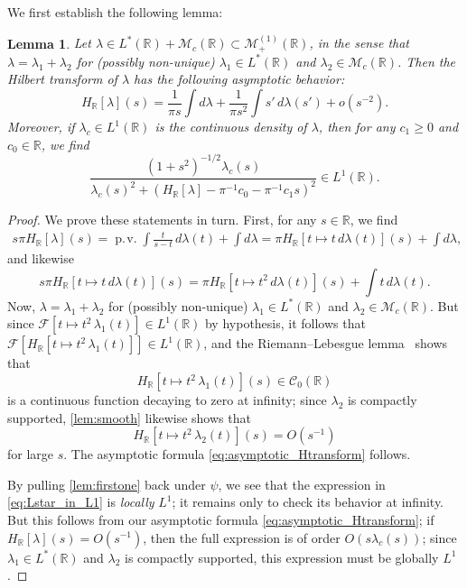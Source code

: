 \documentclass{cams-l} %
\newcommand{\dave}[1]{#1}\newcommand{\davebegin}{}\newcommand{\daveend}{}\newcommand{\george}[1]{#1}
\newcommand{\RR}{\mathbb R}
\newcommand{\cM}{\mathcal M}
\newcommand{\cC}{\mathcal C}
\newcommand{\cF}{\mathcal F}
\newcommand{\op}{\operatorname}
\newcommand{\pv}{\op{p.\!v.}}
\newtheorem{lemma}[theorem]{Lemma}
\theoremstyle{definition}
\theoremstyle{remark}
\numberwithin{equation}{section}
\begin{document}
We first establish the following lemma:
\begin{lemma}\label{lem:Lstar}
    Let $\lambda\in L^*(\RR) +\cM_c(\RR)\subset\cM_+^{(1)}(\RR)$, in the sense that $\lambda=\lambda_1+\lambda_2$ for (possibly non-unique) $\lambda_1\in L^*(\RR)$ and $\lambda_2\in\cM_c(\RR)$. Then the Hilbert transform of $\lambda$ has the following asymptotic behavior:
    \begin{equation}\label{eq:asymptotic_Htransform}
        H_\RR[\lambda](s) = \frac{1}{\pi s} \int d\lambda + \frac{1}{\pi s^2}\int s'\,d\lambda(s') + o(s^{-2}).
    \end{equation}
    Moreover, if $\lambda_c\in L^1(\RR)$ is the continuous density of $\lambda$, then for any $c_1\geq 0$ and $c_0\in\RR$, we find
    \begin{equation}\label{eq:Lstar_in_L1}
        \frac{(1+s^2)^{-1/2}\lambda_c(s)}{\lambda_c(s)^2 + (H_\RR[\lambda] - \pi^{-1}c_0 - \pi^{-1}c_1s)^2}\in L^1(\RR).
    \end{equation}
\end{lemma}
\begin{proof}
    \dave{We prove these statements in turn. First, for any $s\in\RR$, we find
    \begin{align*}
        s\pi H_\RR[\lambda](s) = \pv\int\frac{t}{s-t}\,d\lambda(t) +  \int d\lambda= \pi H_\RR[t\mapsto t\,d\lambda(t)](s) +  \int d\lambda,
    \end{align*}
    and likewise}
    \[s\pi H_\RR[t\mapsto t\,d\lambda(t)](s) = \pi H_\RR[t\mapsto t^2\,d\lambda(t)](s) + \int t\,d\lambda(t).\]
    Now, $\lambda = \lambda_1 + \lambda_2$ for (possibly non-unique) $\lambda_1\in L^*(\RR)$ and $\lambda_2\in\cM_c(\RR)$. But since $\cF[t\mapsto t^2\,\lambda_1(t)] \in L^1(\RR)$ by hypothesis, it follows that $\cF[H_\RR[t\mapsto t^2\,\lambda_1(t)]]\in L^1(\RR)$, and the Riemann--Lebesgue lemma~\cite{royden2010real} shows that 
    \[H_\RR[t\mapsto t^2\,\lambda_1(t)](s)\in\cC_0(\RR)\]
    is a continuous function decaying to zero at infinity; since $\lambda_2$ is compactly supported, \cref{lem:smooth} likewise shows that 
    \[H_\RR[t\mapsto t^2\,\lambda_2(t)](s) = O(s^{-1})\]
    for large $s$. The asymptotic formula \cref{eq:asymptotic_Htransform} follows.

    By pulling \cref{lem:firstone} back under $\psi$, we see that the expression in \cref{eq:Lstar_in_L1} is \emph{locally} $L^1$; it remains only to check its behavior at infinity. But this follows from our asymptotic formula \cref{eq:asymptotic_Htransform}; if $H_\RR[\lambda](s)=O(s^{-1})$, then the full expression is of order $O(s\lambda_c(s))$; since $\lambda_1\in L^*(\RR)$ and $\lambda_2$ is compactly supported, this expression must be globally $L^1$.
\end{proof}
    
\end{document}
